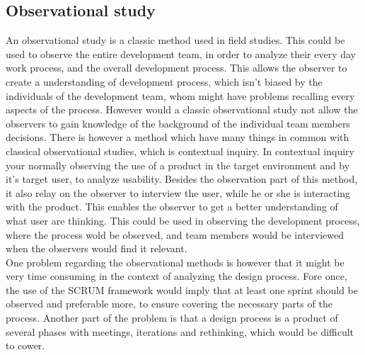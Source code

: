 \subsection*{Observational study}
\label{MethodObservation}
An observational study is a classic method used in field studies. This could be used to observe the entire development team, in order to analyze their every day work process, and the overall development process. This allows the observer to create a understanding of development process, which isn't biased by the individuals of the development team, whom might have problems recalling every aspects of the process. However would a classic observational study not allow the observers to gain knowledge of the background of the individual team members decisions. There is however a method which have many things in common with classical observational studies, which is contextual inquiry. In contextual inquiry your normally observing the use of a product in the target environment and by it's target user, to analyze usability. Besides the observation part of this method, it also relay on the observer to interview the user, while he or she is interacting with the product. This enables the observer to get a better understanding of what user are thinking. This could be used in observing the development process, where the process wold be observed, and team members would be interviewed when the observers would find it relevant. \\
One problem regarding the observational methods is however that it might be very time consuming in the context of analyzing the design process. Fore once, the use of the SCRUM framework would imply that at least one sprint should be observed and preferable more, to ensure covering the necessary parts of the process. Another part of the problem is that a design process is a product of several phases with meetings, iterations and rethinking, which would be difficult to cower.


